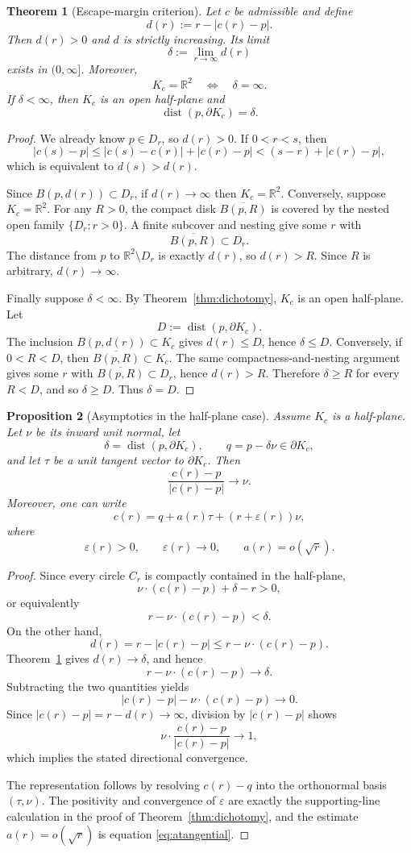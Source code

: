 \documentclass[11pt]{article}
\newtheorem{theorem}{Theorem}[section]
\newtheorem{proposition}[theorem]{Proposition}
\newcommand{\R}{\mathbb{R}}
\newcommand{\ol}{\overline}
\DeclareMathOperator{\dist}{dist}
\begin{document}
\begin{theorem}[Escape-margin criterion]\label{thm:escape}
Let $c$ be admissible and define
\[
d(r):=r-|c(r)-p|.
\]
Then $d(r)>0$ and $d$ is strictly increasing. Its limit
\[
\delta:=\lim_{r\to\infty}d(r)
\]
exists in $(0,\infty]$. Moreover,
\[
K_c=\R^2
\quad\Longleftrightarrow\quad
\delta=\infty.
\]
If $\delta<\infty$, then $K_c$ is an open half-plane and
\[
\dist(p,\partial K_c)=\delta.
\]
\end{theorem}

\begin{proof}
We already know $p\in D_r$, so $d(r)>0$. If $0<r<s$, then
\[
|c(s)-p|
\le |c(s)-c(r)|+|c(r)-p|
<(s-r)+|c(r)-p|,
\]
which is equivalent to $d(s)>d(r)$.

Since $B(p,d(r))\subset D_r$, if $d(r)\to\infty$ then $K_c=\R^2$.
Conversely, suppose $K_c=\R^2$. For any $R>0$, the compact disk $\ol{B(p,R)}$ is covered by the nested open family $\{D_r:r>0\}$. A finite subcover and nesting give some $r$ with
\[
\ol{B(p,R)}\subset D_r.
\]
The distance from $p$ to $\R^2\setminus D_r$ is exactly $d(r)$, so $d(r)>R$. Since $R$ is arbitrary, $d(r)\to\infty$.

Finally suppose $\delta<\infty$. By Theorem~\ref{thm:dichotomy}, $K_c$ is an open half-plane. Let
\[
D:=\dist(p,\partial K_c).
\]
The inclusion $B(p,d(r))\subset K_c$ gives $d(r)\le D$, hence $\delta\le D$. Conversely, if $0<R<D$, then $\ol{B(p,R)}\subset K_c$. The same compactness-and-nesting argument gives some $r$ with $\ol{B(p,R)}\subset D_r$, hence $d(r)>R$. Therefore $\delta\ge R$ for every $R<D$, and so $\delta\ge D$. Thus $\delta=D$.
\end{proof}

\begin{proposition}[Asymptotics in the half-plane case]\label{prop:asymptotic}
Assume $K_c$ is a half-plane. Let $\nu$ be its inward unit normal, let
\[
\delta=\dist(p,\partial K_c),
\qquad
q=p-\delta\nu\in\partial K_c,
\]
and let $\tau$ be a unit tangent vector to $\partial K_c$. Then
\[
\frac{c(r)-p}{|c(r)-p|}\longrightarrow\nu.
\]
Moreover, one can write
\[
c(r)=q+a(r)\tau+(r+\varepsilon(r))\nu,
\]
where
\[
\varepsilon(r)>0,
\qquad
\varepsilon(r)\to0,
\qquad
a(r)=o(\sqrt r).
\]
\end{proposition}

\begin{proof}
Since every circle $C_r$ is compactly contained in the half-plane,
\[
\nu\cdot(c(r)-p)+\delta-r>0,
\]
or equivalently
\[
r-\nu\cdot(c(r)-p)<\delta.
\]
On the other hand,
\[
d(r)=r-|c(r)-p|
\le r-\nu\cdot(c(r)-p).
\]
Theorem~\ref{thm:escape} gives $d(r)\to\delta$, and hence
\[
r-\nu\cdot(c(r)-p)\to\delta.
\]
Subtracting the two quantities yields
\[
|c(r)-p|-\nu\cdot(c(r)-p)\to0.
\]
Since $|c(r)-p|=r-d(r)\to\infty$, division by $|c(r)-p|$ shows
\[
\nu\cdot\frac{c(r)-p}{|c(r)-p|}\to1,
\]
which implies the stated directional convergence.

The representation follows by resolving $c(r)-q$ into the orthonormal basis $(\tau,\nu)$. The positivity and convergence of $\varepsilon$ are exactly the supporting-line calculation in the proof of Theorem~\ref{thm:dichotomy}, and the estimate $a(r)=o(\sqrt r)$ is equation \eqref{eq:atangential}.
\end{proof}
\end{document}
